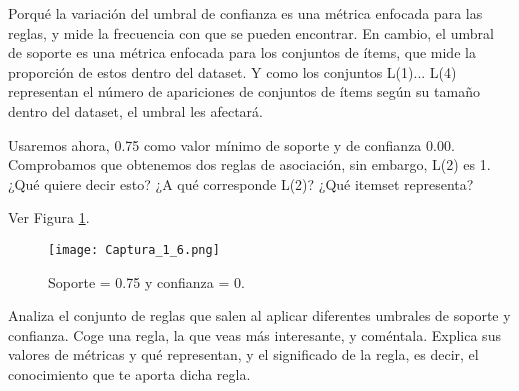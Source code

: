 \documentclass[11pt]{exam}
\begin{document}
\begin{questions}

Porqué la variación del umbral de confianza es una métrica enfocada para las reglas, y mide la frecuencia con que se pueden encontrar. En cambio, el umbral de soporte es una métrica enfocada para los conjuntos de ítems, que mide la proporción de estos dentro del dataset. Y como los  conjuntos L(1)... L(4) representan el número de apariciones de conjuntos de ítems según su tamaño dentro del dataset, el umbral les afectará.

{\question Usaremos ahora, 0.75 como valor mínimo de soporte y de confianza 0.00. Comprobamos que obtenemos dos reglas de asociación, sin embargo, L(2) es 1. ¿Qué quiere decir esto? ¿A qué corresponde L(2)? ¿Qué itemset representa?}

Ver Figura \ref{Captura_1_6}.

\begin{figure}[h]
	\centering
	\texttt{[image: Captura\_1\_6.png]}
	\caption{Soporte = 0.75 y confianza = 0.}
	\label{Captura_1_6}
\end{figure}

\newpage
{\question Analiza el conjunto de reglas que salen al aplicar diferentes umbrales de soporte y confianza. Coge una regla, la que veas más interesante, y coméntala. Explica sus valores de métricas y qué representan, y el significado de la regla, es decir, el conocimiento que te aporta dicha regla.}


\end{questions}
\end{document}
